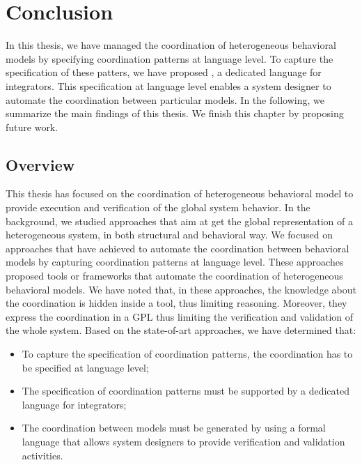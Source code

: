 \chapter{Conclusion}
\label{ch:conclusions}
In this thesis, we have managed the coordination of heterogeneous behavioral models by specifying coordination patterns at language level. To capture the specification of these patters, we have proposed \bcool, a dedicated language for integrators. This specification at language level enables a system designer to automate the coordination between particular models. In the following, we summarize the main findings of this thesis. We finish this chapter by proposing future work.    

\section{Overview}
	
	
This thesis has focused on the coordination of heterogeneous behavioral model to provide execution and verification of the global system behavior. In the background, we studied approaches that aim at get the global representation of a heterogeneous system, in both structural and behavioral way. We focused on approaches that have achieved to automate the coordination between behavioral models by capturing coordination patterns at language level. These approaches proposed tools or frameworks that automate the coordination of heterogeneous behavioral models. We have noted that, in these approaches, the knowledge about the coordination is hidden inside a tool, thus limiting reasoning. Moreover, they express the coordination in a GPL thus limiting the verification and validation of the whole system. Based on the state-of-art approaches, we have determined that:
	\begin{itemize}

	\item To capture the specification of coordination patterns, the coordination has to be specified at language level;
	 
	\item The specification of coordination patterns must be supported by a dedicated language for integrators; 
	 
	\item The coordination between models must be generated by using a formal language that allows system designers to provide verification and validation activities.
	
\end{itemize}
	  
